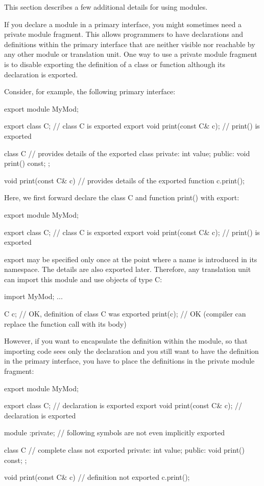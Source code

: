 
This section describes a few additional details for using modules.


If you declare a module in a primary interface, you might sometimes need a private module fragment. This allows programmers to have declarations and definitions within the primary interface that are neither visible nor reachable by any other module or translation unit. One way to use a private module fragment is to disable exporting the definition of a class or function although its declaration is exported.

Consider, for example, the following primary interface:

\begin{cpp}
export module MyMod;

export class C; // class C is exported
export void print(const C& c); // print() is exported

class C { // provides details of the exported class
private:
	int value;
public:
	void print() const;
};

void print(const C& c) { // provides details of the exported function
	c.print();
}
\end{cpp}

Here, we first forward declare the class C and function print() with export:

\begin{cpp}
export module MyMod;

export class C; // class C is exported
export void print(const C& c); // print() is exported
\end{cpp}

export may be specified only once at the point where a name is introduced in its namespace. The details are also exported later. Therefore, any translation unit can import this module and use objects of type C:

\begin{cpp}
import MyMod;
...

C c; // OK, definition of class C was exported
print(c); // OK (compiler can replace the function call with its body)
\end{cpp}

However, if you want to encapsulate the definition within the module, so that importing code sees only the declaration and you still want to have the definition in the primary interface, you have to place the definitions in the private module fragment:

\begin{cpp}
export module MyMod;

export class C; // declaration is exported
export void print(const C& c); // declaration is exported

module :private; // following symbols are not even implicitly exported

class C { // complete class not exported
	private:
	int value;
	public:
	void print() const;
};

void print(const C& c) { // definition not exported
	c.print();
}
\end{cpp}


